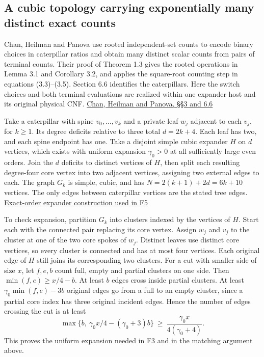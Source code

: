 \documentclass[11pt,a4paper]{article}
\begin{document}
\subsection{A cubic topology carrying exponentially many distinct exact
counts}\label{v8-a-cubic-topology-carrying-exponentially-many-distinct-exact-counts}

Chan, Heilman and Panova use rooted independent-set counts to encode
binary choices in caterpillar ratios and obtain many distinct scalar
counts from pairs of terminal counts. Their proof of Theorem 1.3 gives
the rooted operations in Lemma 3.1 and Corollary 3.2, and applies the
square-root counting step in equations (3.3)--(3.5). Section 6.6
identifies the caterpillars. Here the switch choices and both terminal
evaluations are realized within one expander host and its original
physical CNF. \href{https://arxiv.org/html/2604.19094}{Chan, Heilman and
Panova, §§3 and 6.6}

Take a caterpillar with spine \(v_0,\ldots,v_k\) and a private leaf
\(w_j\) adjacent to each \(v_j\), for \(k\ge1\). Its degree deficits
relative to three total \(d=2k+4\). Each leaf has two, and each spine
endpoint has one. Take a disjoint simple cubic expander \(H\) on \(d\)
vertices, which exists with uniform expansion \(\gamma_0>0\) at all
sufficiently large even orders. Join the \(d\) deficits to distinct
vertices of \(H\), then split each resulting degree-four core vertex
into two adjacent vertices, assigning two external edges to each. The
graph \(G_k\) is simple, cubic, and has \(N=2(k+1)+2d=6k+10\) vertices.
The only edges between caterpillar vertices are the stated tree edges.
\hyperref[v8-section-stronger-family]{Exact-order expander construction
used in F5}

To check expansion, partition \(G_k\) into clusters indexed by the
vertices of \(H\). Start each with the connected pair replacing its core
vertex. Assign \(w_j\) and \(v_j\) to the cluster at one of the two core
spokes of \(w_j\). Distinct leaves use distinct core vertices, so every
cluster is connected and has at most four vertices. Each original edge
of \(H\) still joins its corresponding two clusters. For a cut with
smaller side of size \(x\), let \(f,e,b\) count full, empty and partial
clusters on one side. Then \(\min(f,e)\ge x/4-b\). At least \(b\) edges
cross inside partial clusters. At least \(\gamma_0\min(f,e)-3b\)
original edges go from a full to an empty cluster, since a partial core
index has three original incident edges. Hence the number of edges
crossing the cut is at least \[
       \max\{b,\ \gamma_0 x/4-(\gamma_0+3)b\}
                       \ \ge\ \frac{\gamma_0 x}{4(\gamma_0+4)} .
\] This proves the uniform expansion needed in F3 and in the matching
argument above.
\end{document}
